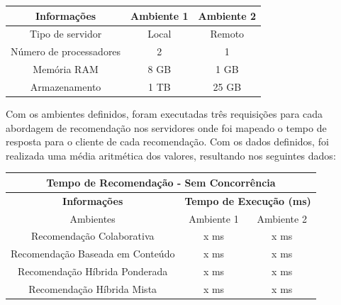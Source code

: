 \begin{table}[H]
\centering
\begin{tabular}{|c|c|c|}
\hline
\textbf{Informações}    & \textbf{Ambiente 1} & \textbf{Ambiente 2} \\ \hline
Tipo de servidor        & Local               & Remoto              \\ \hline
Número de processadores & 2                   & 1                   \\ \hline
Memória RAM             & 8 GB                & 1 GB                \\ \hline
Armazenamento           & 1 TB                & 25 GB               \\ \hline
\end{tabular}
\end{table}

Com os ambientes definidos, foram executadas três requisições para cada abordagem de recomendação nos servidores onde foi mapeado o tempo de resposta para o cliente de cada recomendação. Com os dados definidos, foi realizada uma média aritmética dos valores, resultando nos seguintes dados:

\begin{table}[H]
\centering
\begin{tabular}{|c|c|c|}
\hline
\multicolumn{3}{|c|}{\textbf{Tempo de Recomendação - Sem Concorrência}}                      \\ \hline
\textbf{Informações}                  & \multicolumn{2}{c|}{\textbf{Tempo de Execução (ms)}} \\ \hline
Ambientes                             & Ambiente 1                & Ambiente 2               \\ \hline
Recomendação Colaborativa             & x ms                      & x ms                     \\ \hline
Recomendação Baseada em Conteúdo      & x ms                      & x ms                     \\ \hline
Recomendação Híbrida Ponderada        & x ms                      & x ms                     \\ \hline
Recomendação Híbrida Mista            & x ms                      & x ms                     \\ \hline
\end{tabular}
\end{table}

